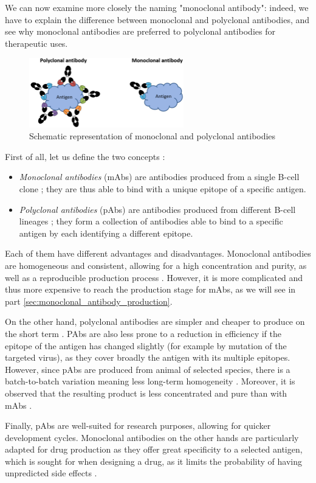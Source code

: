 We can now examine more closely the naming "monoclonal antibody": indeed, we
have to explain the difference between monoclonal and polyclonal antibodies,
and see why monoclonal antibodies are preferred to polyclonal antibodies
for therapeutic uses.

\begin{figure}[H]       
    \centering
    \includegraphics[width=0.6\textwidth]{../Images/Monoclonal_and_Polyclonal_Antibodies.png}   
    \caption{Schematic representation of monoclonal and polyclonal antibodies}
    \label{fig:Monoclonal_and_Polyclonal_Antibodies}
\end{figure}

First of all, let us define the two concepts :

\begin{itemize}
    \item \emph{Monoclonal antibodies} (mAbs) are antibodies produced from a single B-cell
    clone ; they are thus able to bind with a unique epitope of a specific antigen.
    \item \emph{Polyclonal antibodies} (pAbs) are antibodies produced from different B-cell
    lineages ; they form a collection of antibodies able to bind to a specific antigen
    by each identifying a different epitope.
\end{itemize}

Each of them have different advantages and disadvantages. Monoclonal antibodies
are homogeneous and consistent, allowing for a high concentration and purity,
as well as a reproducible production process \cite{lipman_monoclonal_2005}.
However, it is more complicated and thus more expensive to reach the production 
stage for mAbs, as we will see in part \ref{sec:monoclonal_antibody_production}.

On the other hand, polyclonal antibodies are simpler and cheaper to produce
on the short term \cite{nelson_monoclonal_2000}. PAbs are also less prone to
a reduction in efficiency if the epitope of the antigen has changed slightly
(for example by mutation of the targeted virus),
as they cover broadly the antigen with its multiple epitopes. However, since
pAbs are produced from animal of selected species, there is a batch-to-batch
variation meaning less long-term homogeneity \cite{nelson_monoclonal_2000}.
Moreover, it is observed that the resulting product is less concentrated and
pure than with mAbs \cite{lipman_monoclonal_2005}.

Finally, pAbs are well-suited for research purposes, allowing for quicker
development cycles. Monoclonal antibodies on the other hands are particularly
adapted for drug production as they offer great specificity to a selected antigen,
which is sought for when designing a drug, as it limits the probability of
having unpredicted side effects \cite{breedveld_therapeutic_2000}.
